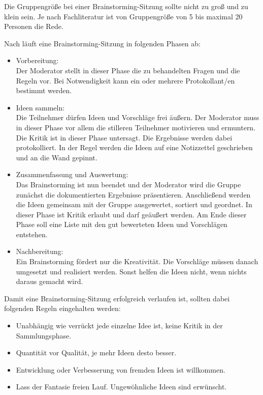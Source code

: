 Die Gruppengröße bei einer Brainstorming-Sitzung sollte nicht zu groß und zu klein sein.  \glqq Je nach Fachliteratur ist von Gruppengröße von 5 bis maximal 20 Personen die Rede\grqq{}. \cite{Pas2012}\bigskip

Nach \cite{Rei2007} läuft eine Brainstorming-Sitzung in folgenden Phasen ab: 

\begin{itemize} 
\item Vorbereitung:\\
Der Moderator stellt in dieser Phase die zu behandelten Fragen und die Regeln vor. Bei Notwendigkeit kann ein oder mehrere Protokollant/en bestimmt werden.

\item Ideen sammeln:\\
Die Teilnehmer dürfen Ideen und Vorschläge frei äußern. Der Moderator muss in dieser Phase vor allem die stilleren Teilnehmer motivieren und ermuntern. Die Kritik ist in dieser Phase untersagt. Die Ergebnisse werden dabei protokolliert. In der Regel werden die Ideen auf eine Notizzettel geschrieben und an die Wand gepinnt.

\item Zusammenfassung und Auswertung:\\
Das Brainstorming ist nun beendet und der Moderator wird die Gruppe zunächst die dokumentierten Ergebnisse präsentieren. Anschließend werden die Ideen gemeinsam mit der Gruppe ausgewertet, sortiert und geordnet. In dieser Phase ist Kritik erlaubt und darf geäußert werden. Am Ende dieser Phase soll eine Liste mit den gut bewerteten Ideen und Vorschlägen entstehen.

\item Nachbereitung:\\
Ein Brainstorming fördert nur die Kreativität. Die Vorschläge müssen danach umgesetzt und realisiert werden. Sonst helfen die Ideen nicht, wenn nichts daraus gemacht wird.
\end{itemize}

Damit eine Brainstorming-Sitzung erfolgreich verlaufen ist, sollten dabei folgenden Regeln eingehalten werden:

\begin{itemize} 
\item Unabhängig wie verrückt jede einzelne Idee ist, keine Kritik in der Sammlungsphase.
\item Quantität vor Qualität, je mehr Ideen desto besser.
\item Entwicklung oder Verbesserung von fremden Ideen ist willkommen.
\item Lass der Fantasie freien Lauf. Ungewöhnliche Ideen sind erwünscht.
\end{itemize}

